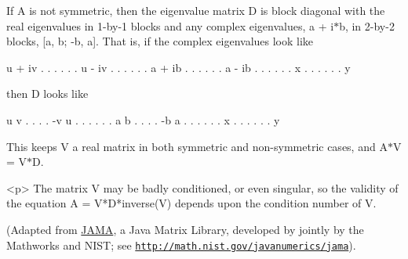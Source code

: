 If A is not symmetric, then the eigenvalue matrix D is block diagonal with the real eigenvalues in 1-\/by-\/1 blocks and any complex eigenvalues, a + i$\ast$b, in 2-\/by-\/2 blocks, \mbox{[}a, b; -\/b, a\mbox{]}. That is, if the complex eigenvalues look like 
\begin{DoxyPre}\end{DoxyPre}



\begin{DoxyPre}          u + iv     .        .          .      .    .
            .      u - iv     .          .      .    .
            .        .      a + ib       .      .    .
            .        .        .        a - ib   .    .
            .        .        .          .      x    .
            .        .        .          .      .    y
\end{DoxyPre}
 then D looks like 
\begin{DoxyPre}\end{DoxyPre}



\begin{DoxyPre}            u        v        .          .      .    .
           -v        u        .          .      .    . 
            .        .        a          b      .    .
            .        .       -b          a      .    .
            .        .        .          .      x    .
            .        .        .          .      .    y
\end{DoxyPre}
 This keeps V a real matrix in both symmetric and non-\/symmetric cases, and A$\ast$\-V = V$\ast$\-D.

\begin{DoxyVerb}<p>
The matrix V may be badly
conditioned, or even singular, so the validity of the equation
A = V*D*inverse(V) depends upon the condition number of V.
\end{DoxyVerb}


(Adapted from \hyperlink{namespaceJAMA}{J\-A\-M\-A}, a Java Matrix Library, developed by jointly by the Mathworks and N\-I\-S\-T; see \href{http://math.nist.gov/javanumerics/jama}{\tt http\-://math.\-nist.\-gov/javanumerics/jama}). 

